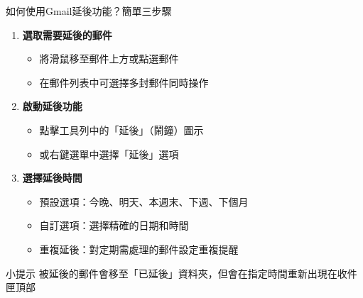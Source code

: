 \documentclass[aspectratio=169]{beamer}
\begin{document}
\begin{frame}{如何使用Gmail延後功能？簡單三步驟}
  
  \begin{enumerate}
    \item \textbf{選取需要延後的郵件}
      \begin{itemize}
        \item 將滑鼠移至郵件上方或點選郵件
        \item 在郵件列表中可選擇多封郵件同時操作
      \end{itemize}
    
    \item \textbf{啟動延後功能}
      \begin{itemize}
        \item 點擊工具列中的「延後」（鬧鐘）圖示
        \item 或右鍵選單中選擇「延後」選項
      \end{itemize}
    
    \item \textbf{選擇延後時間}
      \begin{itemize}
        \item 預設選項：今晚、明天、本週末、下週、下個月
        \item 自訂選項：選擇精確的日期和時間
        \item 重複延後：對定期需處理的郵件設定重複提醒
      \end{itemize}
  \end{enumerate}
  
  \begin{alertblock}{小提示}
    被延後的郵件會移至「已延後」資料夾，但會在指定時間重新出現在收件匣頂部
  \end{alertblock}
\end{frame}
\end{document}

